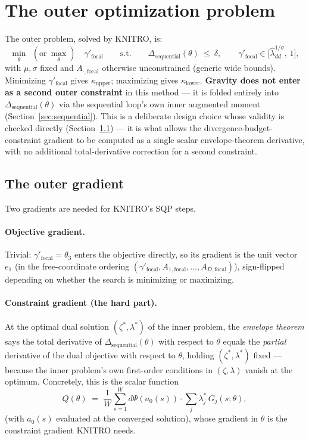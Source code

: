 \documentclass[11pt]{article}
\begin{document}
\section{The outer optimization problem}
\label{sec:outer}

The outer problem, solved by KNITRO, is:
\[
\min_{\theta}\ \ (\text{or}\ \max_\theta)\quad \gamma'_{\text{focal}}
\qquad\text{s.t.}\qquad
\Delta_{\text{sequential}}(\theta)\ \le\ \delta,
\qquad
\gamma'_{\text{focal}}\in\big[\hat\lambda_{dd}^{1/\sigma},\,1\big],
\]
with $\mu,\sigma$ fixed and $A_{\cdot,\text{focal}}$ otherwise unconstrained (generic wide bounds).
Minimizing $\gamma'_{\text{focal}}$ gives $\kappa_{\text{upper}}$; maximizing gives
$\kappa_{\text{lower}}$. \textbf{Gravity does not enter as a second outer constraint} in this
method — it is folded entirely into $\Delta_{\text{sequential}}(\theta)$ via the sequential loop's
own inner augmented moment (Section~\ref{sec:sequential}). This is a deliberate design choice
whose validity is checked directly (Section~\ref{sec:outer-gradient}) — it is what allows the
divergence-budget-constraint gradient to be computed as a single scalar envelope-theorem
derivative, with no additional total-derivative correction for a second constraint.

\subsection{The outer gradient}
\label{sec:outer-gradient}

Two gradients are needed for KNITRO's SQP steps.

\paragraph{Objective gradient.} Trivial: $\gamma'_{\text{focal}}=\theta_3$ enters the objective
directly, so its gradient is the unit vector $e_1$ (in the free-coordinate ordering
$(\gamma'_{\text{focal}}, A_{1,\text{focal}},\dots,A_{D,\text{focal}})$), sign-flipped depending on
whether the search is minimizing or maximizing.

\paragraph{Constraint gradient (the hard part).} At the optimal dual solution $(\zeta^*,\lambda^*)$
of the inner problem, the \emph{envelope theorem} says the total derivative of
$\Delta_{\text{sequential}}(\theta)$ with respect to $\theta$ equals the \emph{partial} derivative
of the dual objective with respect to $\theta$, holding $(\zeta^*,\lambda^*)$ fixed — because the
inner problem's own first-order conditions in $(\zeta,\lambda)$ vanish at the optimum. Concretely,
this is the scalar function
\[
Q(\theta) \;=\; \frac{1}{W}\sum_{s=1}^{W} d\Psi(a_0(s))\cdot\sum_{j}\lambda_j^*\,G_j(s;\theta),
\]
(with $a_0(s)$ evaluated at the converged solution), whose gradient in $\theta$ is the constraint
gradient KNITRO needs.
\end{document}
